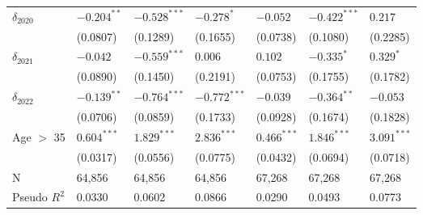\begin{tabular}{lllllll}
$\delta_{2020}$               &   $-0.204^{**}$ &  $-0.528^{***}$ &      $-0.278^*$ &        $-0.052$ &  $-0.422^{***}$ &         $0.217$ \\
                              &        (0.0807) &        (0.1289) &        (0.1655) &        (0.0738) &        (0.1080) &        (0.2285) \\
$\delta_{2021}$               &        $-0.042$ &  $-0.559^{***}$ &         $0.006$ &         $0.102$ &      $-0.335^*$ &       $0.329^*$ \\
                              &        (0.0890) &        (0.1450) &        (0.2191) &        (0.0753) &        (0.1755) &        (0.1782) \\
$\delta_{2022}$               &   $-0.139^{**}$ &  $-0.764^{***}$ &  $-0.772^{***}$ &        $-0.039$ &   $-0.364^{**}$ &        $-0.053$ \\
                              &        (0.0706) &        (0.0859) &        (0.1733) &        (0.0928) &        (0.1674) &        (0.1828) \\
Age $>$ 35                    &   $0.604^{***}$ &   $1.829^{***}$ &   $2.836^{***}$ &   $0.466^{***}$ &   $1.846^{***}$ &   $3.091^{***}$ \\
                              &        (0.0317) &        (0.0556) &        (0.0775) &        (0.0432) &        (0.0694) &        (0.0718) \\
N                             &          64,856 &          64,856 &          64,856 &          67,268 &          67,268 &          67,268 \\
Pseudo $R^2$                  &          0.0330 &          0.0602 &          0.0866 &          0.0290 &          0.0493 &          0.0773 \\
\bottomrule
\end{tabular}
